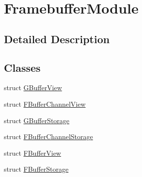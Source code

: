 \hypertarget{group___framebuffer_module}{}\section{Framebuffer\+Module}
\label{group___framebuffer_module}


\subsection{Detailed Description}
\subsection*{Classes}
\begin{DoxyCompactItemize}
\item 
struct \hyperlink{struct_g_buffer_view}{G\+Buffer\+View}
\item 
struct \hyperlink{struct_f_buffer_channel_view}{F\+Buffer\+Channel\+View}
\item 
struct \hyperlink{struct_g_buffer_storage}{G\+Buffer\+Storage}
\item 
struct \hyperlink{struct_f_buffer_channel_storage}{F\+Buffer\+Channel\+Storage}
\item 
struct \hyperlink{struct_f_buffer_view}{F\+Buffer\+View}
\item 
struct \hyperlink{struct_f_buffer_storage}{F\+Buffer\+Storage}
\end{DoxyCompactItemize}
